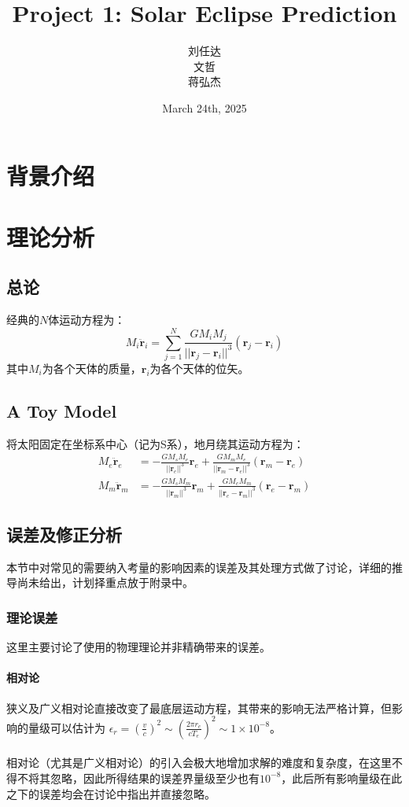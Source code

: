 \documentclass[hidelinks]{article}
\title{\textbf{Project 1: Solar Eclipse Prediction}}
\author{刘任达\\文哲\\蒋弘杰}
\date{March 24th, 2025}
\begin{document}
\hypersetup{bookmarksnumbered=true,}
\maketitle
\setcounter{tocdepth}{2}
\begin{Large}
\tableofcontents
\end{Large}%
\pagebreak

\section{背景介绍}

\section{理论分析}
\subsection{总论}
经典的$N$体运动方程为：
$$
M_i\ddot{\mathbf{r}}_i = \sum_{j=1}^N\frac{GM_iM_j}{||\mathbf{r}_j-\mathbf{r}_i||^3}(\mathbf{r}_j-\mathbf{r}_i)
$$
其中${M_i}$为各个天体的质量，$\mathbf{r}_i$为各个天体的位矢。
\subsection{A Toy Model}
将太阳固定在坐标系中心（记为S系），地月绕其运动方程为：
\begin{align*}
    M_e\ddot{\mathbf{r}}_e&=-\frac{GM_sM_e}{||\mathbf{r}_e||^3}\mathbf{r}_e+\frac{GM_mM_e}{||\mathbf{r}_m-\mathbf{r}_e||^3}(\mathbf{r}_m-\mathbf{r}_e)\\
    M_m\ddot{\mathbf{r}}_m&=-\frac{GM_sM_m}{||\mathbf{r}_m||^3}\mathbf{r}_m+\frac{GM_eM_m}{||\mathbf{r}_e-\mathbf{r}_m||^3}(\mathbf{r}_e-\mathbf{r}_m)
\end{align*}
\subsection{误差及修正分析}
本节中对常见的需要纳入考量的影响因素的误差及其处理方式做了讨论，详细的推导尚未给出，计划择重点放于附录中。
\subsubsection{理论误差}
这里主要讨论了使用的物理理论并非精确带来的误差。
\paragraph{相对论}
狭义及广义相对论直接改变了最底层运动方程，其带来的影响无法严格计算，但影响的量级可以估计为 $\epsilon_r=(\frac{v}{c})^2\sim(\frac{2\pi r_e}{cT_e})^2\sim1\times10^{-8}$。
\\
\\
相对论（尤其是广义相对论）的引入会极大地增加求解的难度和复杂度，在这里不得不将其忽略，因此所得结果的误差界量级至少也有$10^{-8}$，此后所有影响量级在此之下的误差均会在讨论中指出并直接忽略。
\end{document}
